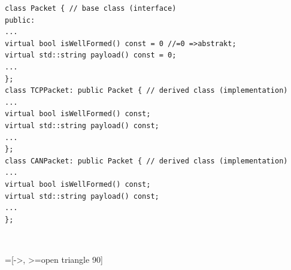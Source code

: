 \begin{minipage}{11cm}
\begin{lstlisting}
class Packet { // base class (interface)
public:
...
virtual bool isWellFormed() const = 0 //=0 =>abstrakt;
virtual std::string payload() const = 0;
...
};
class TCPPacket: public Packet { // derived class (implementation)
...
virtual bool isWellFormed() const;
virtual std::string payload() const;
...
};
class CANPacket: public Packet { // derived class (implementation)
...
virtual bool isWellFormed() const;
virtual std::string payload() const;
...
};
\end{lstlisting}
\end{minipage}~
\begin{minipage}{9cm}
=[->, >=open triangle 90]
\end{minipage}




